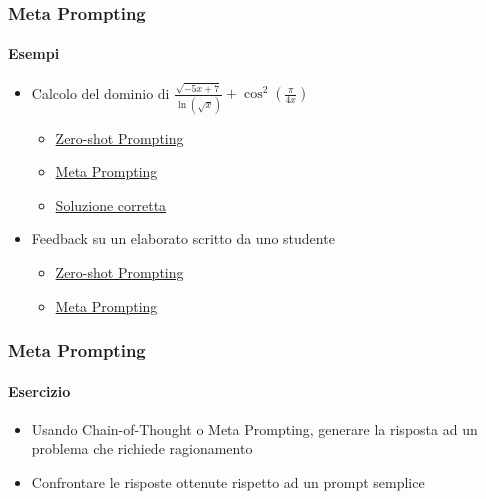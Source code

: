 \begin{exampleframe}
    \frametitle{Meta Prompting}
    \framesubtitle{Esempi}

    \begin{itemize}
        \item Calcolo del dominio di $\frac{\sqrt{-5x + 7}}{\ln(\sqrt{x})} + \cos^2\left(\frac{\pi}{4x}\right)$
        \begin{itemize}
            \item \href{https://chatgpt.com/share/6776910a-2990-8003-a158-e9337a55edf2}{Zero-shot Prompting}
            \item \href{https://chatgpt.com/share/6776a842-0c34-8003-adcb-9c45bbdbd9d8}{Meta Prompting}
            \item \href{https://www.wolframalpha.com/input?i2d=true&i=Divide\%5BSqrt\%5B-5x\%2B7\%5D\%2Cln\%5C\%2840\%29Sqrt\%5Bx\%5D\%5C\%2841\%29\%5D\%2BSquare\%5Bcos\%5C\%2840\%29Divide\%5B\%CF\%80\%2C4x\%5D\%5C\%2841\%29\%5Ddomain}{Soluzione corretta}
        \end{itemize}

        \bigskip
        \item Feedback su un elaborato scritto da uno studente
        \begin{itemize}
            \item \href{https://chatgpt.com/share/6776a962-9c08-8003-bdce-1787adc79515}{Zero-shot Prompting}
            \item \href{https://chatgpt.com/share/6776a77f-8288-8003-86ad-95b7b556fcf6}{Meta Prompting}
        \end{itemize}
    \end{itemize}
\end{exampleframe}

\begin{exerciseframe}
    \frametitle{Meta Prompting}
    \framesubtitle{Esercizio}

    \begin{itemize}
        \item Usando Chain-of-Thought o Meta Prompting, generare la risposta ad un problema che richiede ragionamento

        \bigskip
        \item Confrontare le risposte ottenute rispetto ad un prompt semplice
    \end{itemize}
\end{exerciseframe}


